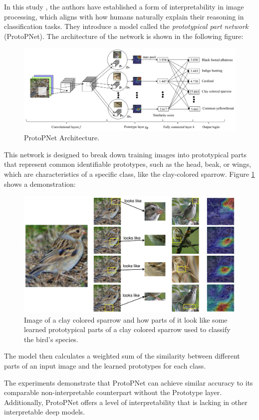 In this study \cite{NEURIPS2019_adf7ee2d}, the authors have established a form of interpretability in image processing, which aligns with how humans naturally explain their reasoning in classification tasks.
They introduce a model called the \textit{prototypical part network} (ProtoPNet). The architecture of the network is shown in the following figure:

\begin{figure}[H]
    \centering
    \includegraphics[width=0.9\linewidth]{pics/ProtoPNet_architecture.png}
    \caption{ProtoPNet Architecture.\cite{NEURIPS2019_adf7ee2d}}
\end{figure}

This network is designed to break down training images into prototypical parts that represent common identifiable prototypes, such as the head, beak, or wings, which are characteristics of a specific class, like the clay-colored sparrow. Figure \ref{fig:sparrow} shows a demonstration:

\begin{figure}[H]
    \centering
    \includegraphics[width=0.7\linewidth]{pics/thisthat.png}
    \caption{Image of a clay colored sparrow and how parts of it look like some learned prototypical parts of a clay colored sparrow used to classify the bird’s species.\cite{NEURIPS2019_adf7ee2d}}
    \label{fig:sparrow}
\end{figure}

The model then calculates a weighted sum of the similarity between different parts of an input image and the learned prototypes for each class. 

The experiments demonstrate that ProtoPNet can achieve similar accuracy to its comparable non-interpretable counterpart without the Prototype layer. Additionally, ProtoPNet offers a level of interpretability that is lacking in other interpretable deep models.
